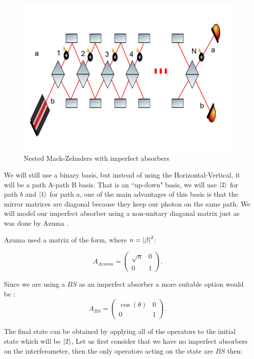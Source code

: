 \documentclass[12pt]{article}
\begin{document}
\begin{figure}[!htb]
\centering
\includegraphics[width=\linewidth]{images/nmach.png}
\caption{Nested Mach-Zehnders  with imperfect absorbers}
\label{fig:BS2}
\end{figure}
 
 We will still use a binary basis, but instead of using the Horizontal-Vertical, it will be a path A-path B basis. That is an ``up-down" basis, we will use $\ket{2}$ for path $b$ and $\ket{1}$ for path $a$, one of the main advantages of this basis is that the mirror matrices are diagonal because they keep our photon on the same path. We will model our imperfect absorber using a non-unitary diagonal matrix just as was done by  Azuma \cite{Azuma}.   
 
 Azuma used a matrix of the form, where $n=\abs{\beta}^{2}$:
 
 \begin{equation}
 A_{Azuma}=\begin{pmatrix} \sqrt{n} & 0\\0& 1\end{pmatrix}.
 \end{equation}

Since we are using a $BS$ as an imperfect absorber a more suitable option would be :
\begin{equation}
 A_{BS}=\begin{pmatrix} \cos(\theta) & 0\\0& 1\end{pmatrix}.
\end{equation}

The final state can be obtained by applying all of the operators to the initial state which will be $\ket{2}$, Let us first consider that we have no imperfect absorbers on the interferometer, then the only operators acting on the state are $BS$ then:
\end{document}
